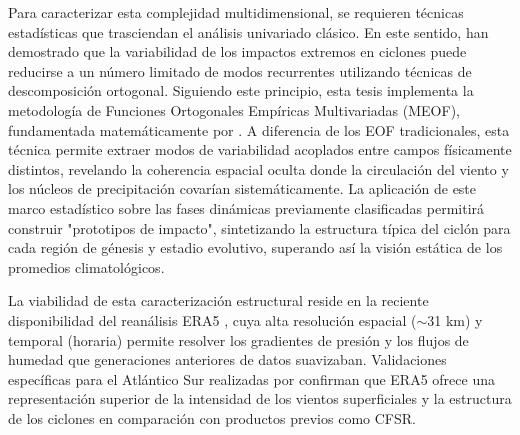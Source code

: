Para caracterizar esta complejidad multidimensional, se requieren técnicas estadísticas que trasciendan el análisis univariado clásico. En este sentido, \citet{eisenstein2023identification} han demostrado que la variabilidad de los impactos extremos en ciclones puede reducirse a un número limitado de modos recurrentes utilizando técnicas de descomposición ortogonal.
Siguiendo este principio, esta tesis implementa la metodología de Funciones Ortogonales Empíricas Multivariadas (MEOF), fundamentada matemáticamente por \citet{liang2018multivariate}. A diferencia de los EOF tradicionales, esta técnica permite extraer modos de variabilidad acoplados entre campos físicamente distintos, revelando la coherencia espacial oculta donde la circulación del viento y los núcleos de precipitación covarían sistemáticamente.
La aplicación de este marco estadístico sobre las fases dinámicas previamente clasificadas permitirá construir "prototipos de impacto", sintetizando la estructura típica del ciclón para cada región de génesis y estadio evolutivo, superando así la visión estática de los promedios climatológicos.


La viabilidad de esta caracterización estructural reside en la reciente disponibilidad del reanálisis ERA5 \citep{hersbach2020era5}, cuya alta resolución espacial ($\sim$31 km) y temporal (horaria) permite resolver los gradientes de presión y los flujos de humedad que generaciones anteriores de datos suavizaban. Validaciones específicas para el Atlántico Sur realizadas por \citet{gramcianinov2020analysis} confirman que ERA5 ofrece una representación superior de la intensidad de los vientos superficiales y la estructura de los ciclones en comparación con productos previos como CFSR.

